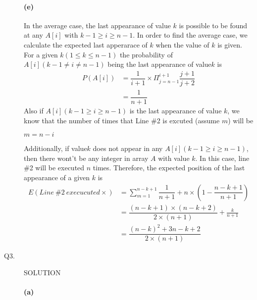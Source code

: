 \documentclass[11pt]{csc_assignment}
\begin{document}
\begin{description}
\paragraph{(e)}
In the average case, the last appearance of value $ k $ is possible to be found at any $ A[i] $ with $ k-1\geq i\geq n-1 $. In order to find the average case, we calculate the expected last apperarace of $ k $ when the value of $ k $ is given.\\
For a given $ k (1\leq k \leq n-1) $ the probability of $ A[i] (k-1\neq i \neq n-1) $ being the last appearance of value$ k $ is
\begin{align*}
	 P(A[i])&=\dfrac{1}{i+1}\times\Pi_{j=n-1}^{i+1}\dfrac{j+1}{j+2}\\
	 &=  \dfrac{1}{n+1} 
\end{align*} 
Also if $ A[i] (k-1\geq i\geq n-1 ) $ is the last appearance of value $ k $, we know that the number of times that Line \#2 is excuted (assume $ m $) will be
\begin{center}
	$ m=n-i$
\end{center} 
Additionally, if value$ k $ does not appear in any $ A[i] (k-1\geq i\geq n-1 ) $, then there wont't be any integer in array $ A $ with value $ k $. In this case, line \#2 will be executed $ n $ times. Therefore, the expected position of the last appearance of a given $ k $ is  
\begin{align*}
	 E(Line\ \#2\ execucuted\times)&=\sum_{m=1}^{n-k+1}\dfrac{1}{n+1}+n\times (1-\dfrac{n-k+1}{n+1})\\
	 &=  \dfrac{(  n-k+1)\times(n-k+2)}{2\times(n+1)}+\frac{k}{n+1}\\
	 &=\dfrac{(n-k)^{2}+3n-k+2}{2\times (n+1)} 
\end{align*} 



\newpage
\item[Q3.]


SOLUTION
\paragraph{(a)}






\end{description}
\end{document}
